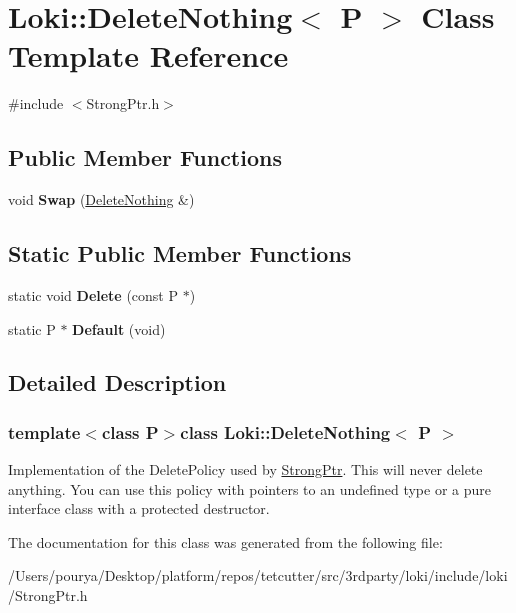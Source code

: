 \hypertarget{classLoki_1_1DeleteNothing}{}\section{Loki\+:\+:Delete\+Nothing$<$ P $>$ Class Template Reference}
\label{classLoki_1_1DeleteNothing}


{\ttfamily \#include $<$Strong\+Ptr.\+h$>$}

\subsection*{Public Member Functions}
\begin{DoxyCompactItemize}
\item 
\hypertarget{classLoki_1_1DeleteNothing_ac633c1a4d6bd2d39c5fcbd25f8ef40d9}{}void {\bfseries Swap} (\hyperlink{classLoki_1_1DeleteNothing}{Delete\+Nothing} \&)\label{classLoki_1_1DeleteNothing_ac633c1a4d6bd2d39c5fcbd25f8ef40d9}

\end{DoxyCompactItemize}
\subsection*{Static Public Member Functions}
\begin{DoxyCompactItemize}
\item 
\hypertarget{classLoki_1_1DeleteNothing_aeb2921986d43e83de90eeb6d924f1e8f}{}static void {\bfseries Delete} (const P $\ast$)\label{classLoki_1_1DeleteNothing_aeb2921986d43e83de90eeb6d924f1e8f}

\item 
\hypertarget{classLoki_1_1DeleteNothing_a3fc4a1ea9693be58454f32c48170390b}{}static P $\ast$ {\bfseries Default} (void)\label{classLoki_1_1DeleteNothing_a3fc4a1ea9693be58454f32c48170390b}

\end{DoxyCompactItemize}


\subsection{Detailed Description}
\subsubsection*{template$<$class P$>$class Loki\+::\+Delete\+Nothing$<$ P $>$}

Implementation of the Delete\+Policy used by \hyperlink{classLoki_1_1StrongPtr}{Strong\+Ptr}. This will never delete anything. You can use this policy with pointers to an undefined type or a pure interface class with a protected destructor. 

The documentation for this class was generated from the following file\+:\begin{DoxyCompactItemize}
\item 
/\+Users/pourya/\+Desktop/platform/repos/tetcutter/src/3rdparty/loki/include/loki/Strong\+Ptr.\+h\end{DoxyCompactItemize}
